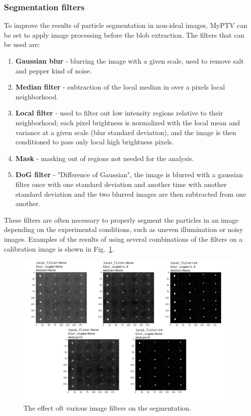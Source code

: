 \documentclass[10pt,a4paper]{article}
\begin{document}
\subsubsection{Segmentation filters}\label{sec:segment_filters}

To improve the results of particle segmentation in non-ideal images, MyPTV can be set to apply image processing before the blob extraction. The filters that can be used are: 
%
\begin{enumerate}
	\item \textbf{Gaussian blur} - blurring the image with a given scale, used to remove salt and pepper kind of noise.
	\item \textbf{Median filter} - subtraction of the local median in over a pixels local neighborhood. 
	\item \textbf{Local filter} - used to filter out low intensity regions relative to their neighborhood; each pixel brightness is normalized with the local mean and variance at a given scale (blur standard deviation), and the image is then conditioned to pass only local high brightness pixels.
	\item \textbf{Mask} - masking out of regions not needed for the analysis.
	\item \textbf{DoG filter} - "Difference of Gaussian", the image is blurred with a gaussian filter once with one standard deviation and another time with another standard deviation and the two blurred images are then subtracted from one another.
\end{enumerate}
%
These filters are often necessary to properly segment the particles in an image depending on the experimental conditions, such as uneven illumination or noisy images. Examples of the results of using several combinations of the filters on a calibration image is shown in Fig.~\ref{fig:image_filters}. 




\begin{figure}[h!]
	\centering
	\includegraphics[width=12cm]{filters_effect.pdf}
	\caption{The effect oft various image filters on the segmentation.\label{fig:image_filters}}
\end{figure}
\end{document}
